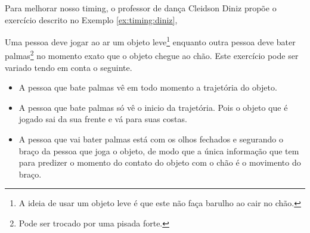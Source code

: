 Para melhorar nosso timing, o professor de dança Cleidson Diniz propõe \cite{TimingTreino1} 
o exercício descrito no Exemplo \ref{ex:timing:diniz},
\begin{example}
\label{ex:timing:diniz}
Uma pessoa deve jogar ao ar um objeto leve\footnote{A ideia de usar um objeto leve 
é que este não faça barulho ao cair no chão.} 
enquanto outra pessoa deve bater palmas\footnote{Pode ser trocado por uma pisada forte.} 
no momento exato que o objeto chegue ao chão.
Este exercício pode ser variado tendo em conta o seguinte.
\begin{itemize}
\item A pessoa que bate palmas vê em todo momento a trajetória do objeto.
\item A pessoa que bate palmas só vê o inicio da trajetória. 
Pois o objeto que é jogado sai da sua frente e vá para suas costas.
\item A pessoa que vai bater palmas está com os olhos fechados
e segurando o braço da pessoa que joga o objeto,
de modo que a única informação que tem 
para predizer o momento do contato do objeto com o chão 
é o movimento do braço. 
\end{itemize}
\vspace{-10pt}
\end{example}



